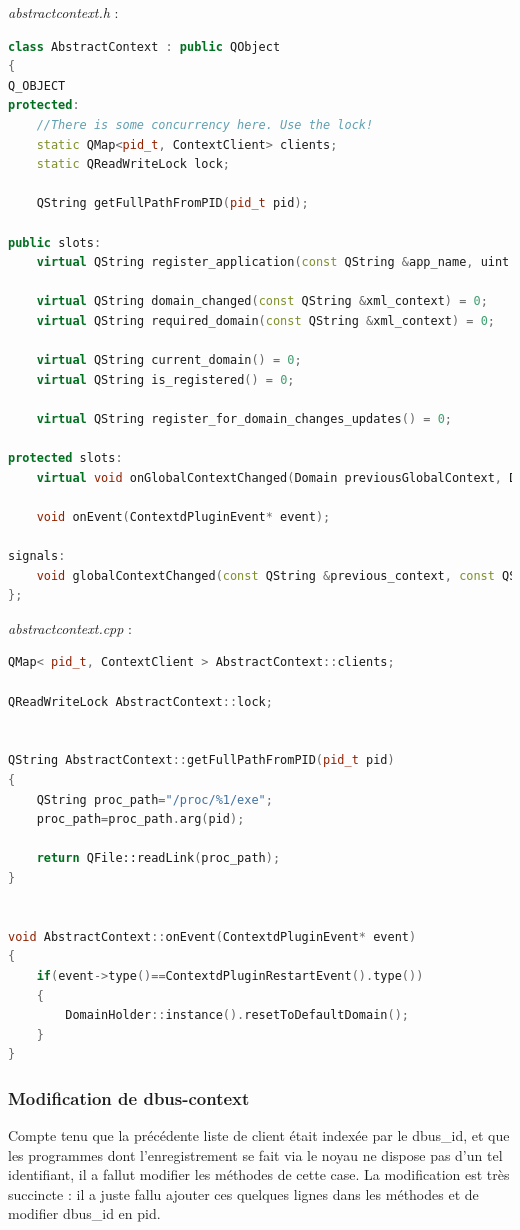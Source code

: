 \documentclass[pdftex,a4paper,titlepage,11pt]{article}
\begin{document}
\textit{abstractcontext.h} : 
\begin{lstlisting}[language=C++]
class AbstractContext : public QObject
{
Q_OBJECT
protected:
	//There is some concurrency here. Use the lock!
	static QMap<pid_t, ContextClient> clients;
	static QReadWriteLock lock;

	QString getFullPathFromPID(pid_t pid);

public slots:
	virtual QString register_application(const QString &app_name, uint app_pid) = 0;

	virtual QString domain_changed(const QString &xml_context) = 0;
	virtual QString required_domain(const QString &xml_context) = 0;

	virtual QString current_domain() = 0;
	virtual QString is_registered() = 0;

	virtual QString register_for_domain_changes_updates() = 0;

protected slots:
	virtual void onGlobalContextChanged(Domain previousGlobalContext, Domain globalContext) = 0;

	void onEvent(ContextdPluginEvent* event);

signals:
	void globalContextChanged(const QString &previous_context, const QString &new_context);
};
\end{lstlisting}

\textit{abstractcontext.cpp} : 
\begin{lstlisting}[language=C++]
QMap< pid_t, ContextClient > AbstractContext::clients;

QReadWriteLock AbstractContext::lock;


QString AbstractContext::getFullPathFromPID(pid_t pid)
{
	QString proc_path="/proc/%1/exe";
	proc_path=proc_path.arg(pid);

	return QFile::readLink(proc_path);
}


void AbstractContext::onEvent(ContextdPluginEvent* event)
{
	if(event->type()==ContextdPluginRestartEvent().type())
	{
		DomainHolder::instance().resetToDefaultDomain();
	}
}
\end{lstlisting}

\subsubsection{Modification de dbus-context}

Compte tenu que la précédente liste de client était indexée par le dbus\_id, et que les programmes dont l'enregistrement se fait via le noyau ne dispose pas d'un tel identifiant, il a fallut modifier les méthodes de cette case. La modification est très succincte : il a juste fallu ajouter ces quelques lignes dans les méthodes et de modifier dbus\_id en pid.
\end{document}
